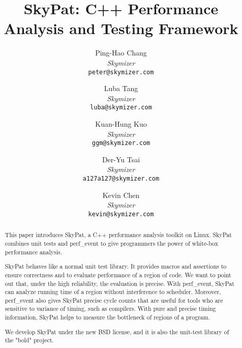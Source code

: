 \documentclass[final]{ols}
\begin{document}
\title{SkyPat: C++ Performance Analysis and Testing Framework}
\subtitle{}

\author{
	Ping-Hao Chang \\
	{\em Skymizer}\\
	{\tt\small peter@skymizer.com}\\
\and
	Luba Tang\\
	{\em Skymizer}\\
	{\tt\small luba@skymizer.com}\\
\and
	Kuan-Hung Kuo\\
	{\em Skymizer}\\
	{\tt\small ggm@skymizer.com}\\
\and
	Der-Yu Tsai\\
	{\em Skymizer}\\
	{\tt\small a127a127@skymizer.com}\\
\and
	Kevin Chen\\
	{\em Skymizer}\\
	{\tt\small kevin@skymizer.com}
}

\date{} %

\maketitle


\begin{abstract}
This paper introduces SkyPat, a C++ performance analysis toolkit on Linux. 
SkyPat combines unit tests and perf\_event to give programmers the power of white-box performance analysis.

SkyPat behaves like a normal unit test library. 
It provides macros and assertions to ensure correctness and to evaluate performance of a region of code. 
We want to point out that, under the high reliability, the evaluation is precise. 
With perf\_event, SkyPat can analyze running time of a region without interference to scheduler. 
Moreover, perf\_event also gives SkyPat precise cycle counts that are useful for tools who are sensitive to variance of timing, such as compilers.
With pure and precise timing information, SkyPat helps to measure the bottleneck of regions of a program.

We develop SkyPat under the new BSD license, and it is also the unit-test library of the "bold" project.
\end{abstract}
\end{document}
